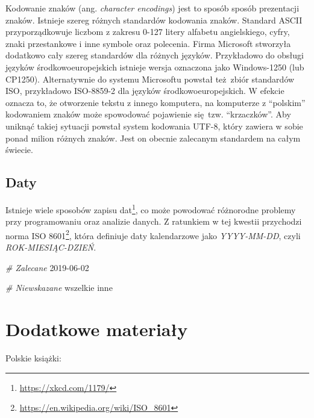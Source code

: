 \documentclass[paper=6in:9in,pagesize=pdftex,headinclude=on,footinclude=on,10pt]{scrbook}
\newenvironment{Shaded}{\begin{snugshade}}{\end{snugshade}}
\newcommand{\CommentTok}[1]{\textcolor[rgb]{0.56,0.35,0.01}{\textit{#1}}}
\newcommand{\DecValTok}[1]{\textcolor[rgb]{0.00,0.00,0.81}{#1}}
\newcommand{\NormalTok}[1]{#1}
\DeclareRobustCommand{\href}[2]{#2\footnote{\url{#1}}}
\let\BeginKnitrBlock\begin \let\EndKnitrBlock\end
\begin{document}
\BeginKnitrBlock{rmdinfo}
Kodowanie znaków (ang. \emph{character encodings}) jest to sposób sposób prezentacji znaków.
Istnieje szereg różnych standardów kodowania znaków.
Standard ASCII przyporządkowuje liczbom z zakresu 0-127 litery alfabetu angielskiego, cyfry, znaki przestankowe i inne symbole oraz polecenia.
Firma Microsoft stworzyła dodatkowo cały szereg standardów dla różnych języków.
Przykładowo do obsługi języków środkowoeuropejskich istnieje wersja oznaczona jako Windows-1250 (lub CP1250).
Alternatywnie do systemu Microsoftu powstał też~zbiór standardów ISO, przykładowo ISO-8859-2 dla języków środkowoeuropejskich.
W efekcie oznacza to, że otworzenie tekstu z innego komputera, na komputerze z ``polskim'' kodowaniem znaków może spowodować pojawienie się~tzw. ``krzaczków''.
Aby uniknąć takiej sytuacji powstał system kodowania UTF-8, który zawiera w sobie ponad milion różnych znaków.
Jest on obecnie zalecanym standardem na całym świecie.
\EndKnitrBlock{rmdinfo}

\hypertarget{daty}{%
\subsection{Daty}\label{daty}}

Istnieje wiele sposobów zapisu dat\footnote{\url{https://xkcd.com/1179/}}, co może powodować różnorodne problemy przy programowaniu oraz analizie danych.
Z ratunkiem w tej kwestii przychodzi norma \href{https://en.wikipedia.org/wiki/ISO_8601}{ISO 8601}, która definiuje daty kalendarzowe jako \emph{YYYY-MM-DD}, czyli \emph{ROK-MIESIĄC-DZIEŃ}.

\begin{Shaded}
\begin{Highlighting}[]
\CommentTok{# Zalecane}
\DecValTok{2019-06-02}

\CommentTok{# Niewskazane}
\NormalTok{wszelkie inne}
\end{Highlighting}
\end{Shaded}

\hypertarget{resources}{%
\section{Dodatkowe materiały}\label{resources}}

Polskie książki:
\end{document}
